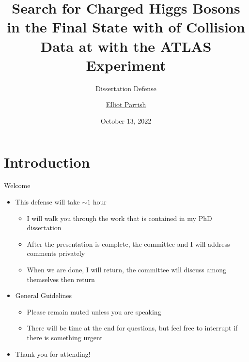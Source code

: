\documentclass[aspectratio=169,xcolor=table]{beamer}
\title[Search for \HpmLong with ATLAS]
{Search for Charged Higgs Bosons in the \taulep Final State with \LUMI of \pp Collision Data at \sqs with the ATLAS Experiment}
\subtitle{Dissertation Defense}
\author[Elliot Parrish]
{\texorpdfstring{\underline{Elliot Parrish}}{Elliot Parrish}}
\institute[NIU] {\inst{\dag}Northern Illinois University, USA}
\date{October 13, 2022}
\begin{document}
\frame{\titlepage}




\begin{frame}{\contentsname}
  \begin{multicols}{2}
    \tableofcontents
  \end{multicols}
\end{frame}

\section{Introduction }
  
  \begin{frame}[t]{Welcome}
    \begin{itemize}
      \item This defense will take $\sim 1$ hour
      \begin{itemize}
        \item I will walk you through the work that is contained in my PhD dissertation
        \item After the presentation is complete, the committee and I will address comments privately
        \item When we are done, I will return, the committee will discuss among themselves then return
      \end{itemize}
      \item General Guidelines
      \begin{itemize}
        \item Please remain muted unless you are speaking
        \item There will be time at the end for questions, but feel free to interrupt if there is something urgent
      \end{itemize}
      \item Thank you for attending!
    \end{itemize}
  \end{frame}
\end{document}
